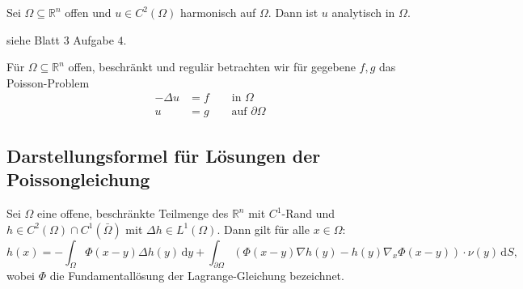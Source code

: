 \begin{satz}
 	   Sei $\Omega \subseteq \mathbb{R}^n$ offen und $u \in C^2(\Omega)$ harmonisch auf $\Omega$. Dann ist $u$ analytisch in $\Omega$.
\end{satz}

\begin{beweis}
	siehe Blatt $3$ Aufgabe $4$.
\end{beweis}

Für $\Omega \subseteq \mathbb{R}^n$ offen, beschränkt und regulär betrachten wir für gegebene $f,g$ das Poisson-Problem
\begin{align}
	- \Delta u &= f \qquad \text{in }\Omega \\
	u &= g \qquad \text{auf }\partial \Omega
\end{align}

\subsection{Darstellungsformel für Lösungen der Poissongleichung} 
\label{sub:darstellungsformel_fur_losungen_der_poissongleichung}

\begin{satz}
	Sei $\Omega $ eine offene, beschränkte Teilmenge des $\mathbb{R}^n$ mit $C^1$-Rand und $h \in C^2(\Omega) \cap C^1(\bar{\Omega})$ mit $ \Delta h \in L^1(\Omega)$.
	Dann gilt für alle $x \in \Omega$:
	\begin{equation}
		h(x) = - \int_{\Omega}^{} \Phi(x-y) \Delta h(y) \,\mathrm{d}y 
		+ \int_{\partial \Omega}^{} \left( \Phi(x-y)  \nabla h(y) - h(y)  \nabla_x \Phi(x-y) \right) \cdot \nu(y) \,\mathrm{d}S,
	\end{equation}
	wobei $\Phi$ die Fundamentallösung der Lagrange-Gleichung bezeichnet.
\end{satz}

